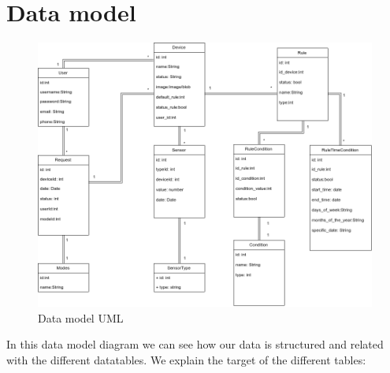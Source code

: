 \documentclass[11pt,a4paper]{article}
\begin{document}
\newpage

\section{Data model}
\begin{figure}[hbtp]
\centering
\includegraphics[scale=0.5]{figures/ModelDeDades.png}
\caption{Data model UML}
\end{figure}
In this data model diagram we can see how our data is structured and related with the different datatables. We explain the target of the different tables:
\end{document}
